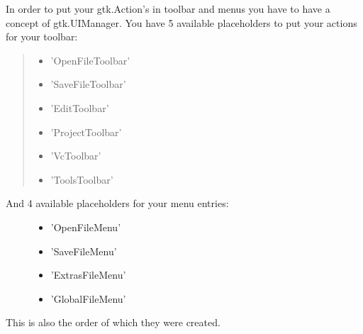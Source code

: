 \documentclass[10pt,a4paper,english]{article}
\begin{document}
In order to put your gtk.Action's in toolbar and menus you have to
have a concept of gtk.UIManager. You have 5 available placeholders to put your
actions for your toolbar:
\begin{quote}
\begin{itemize}
\item {} 
'OpenFileToolbar'

\item {} 
'SaveFileToolbar'

\item {} 
'EditToolbar'

\item {} 
'ProjectToolbar'

\item {} 
'VcToolbar'

\item {} 
'ToolsToolbar'

\end{itemize}
\end{quote}
\begin{description}
\item[And 4 available placeholders for your menu entries:] %
\begin{itemize}
\item {} 
'OpenFileMenu'

\item {} 
'SaveFileMenu'

\item {} 
'ExtrasFileMenu'

\item {} 
'GlobalFileMenu'

\end{itemize}

\end{description}

This is also the order of which they were created.
\end{document}
